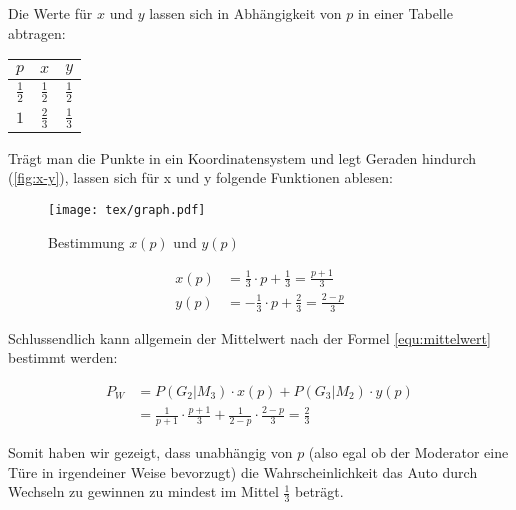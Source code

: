 Die Werte für $x$ und $y$ lassen sich in Abhängigkeit von $p$ in einer Tabelle abtragen:

\begin{center}
    \begin{tabular}[h]{|c|c|c|}
        \hline
        \textbf{$p$}  & \textbf{$x$}  & \textbf{$y$}  \\
        \hline
        $\frac{1}{2}$ & $\frac{1}{2}$ & $\frac{1}{2}$ \\
        $1$           & $\frac{2}{3}$ & $\frac{1}{3}$ \\
        \hline
    \end{tabular}
\end{center}

Trägt man die Punkte in ein Koordinatensystem und legt Geraden hindurch (\autoref{fig:x-y}), lassen sich für x und y folgende Funktionen ablesen:

\begin{figure}[hbtp]
    \centering
    \captionsetup{name=Abb., justification=centering, format=nolinebreak}
    \texttt{[image: tex/graph.pdf]}
    \caption{Bestimmung $x(p)$ und $y(p)$} \label{fig:x-y}
\end{figure}

\begin{align*}
    x(p) & = \frac{1}{3} \cdot p + \frac{1}{3} = \frac{p + 1}{3} \\
    y(p) & = -\frac{1}{3} \cdot p + \frac{2}{3} = \frac{2-p}{3}
\end{align*}

Schlussendlich kann allgemein der Mittelwert nach der Formel \ref{equ:mittelwert} bestimmt werden:

\begin{align*}
    P_W & = P(G_2 | M_3) \cdot x(p) + P(G_3 | M_2) \cdot y(p)                                       \\
        & = \frac{1}{p+1} \cdot \frac{p + 1}{3} + \frac{1}{2-p} \cdot \frac{2 - p}{3} = \frac{2}{3}
\end{align*}

Somit haben wir gezeigt, dass unabhängig von $p$ (also egal ob der Moderator eine Türe in irgendeiner Weise bevorzugt) die Wahrscheinlichkeit das Auto durch Wechseln zu gewinnen zu mindest im Mittel $\frac{1}{3}$ beträgt.
